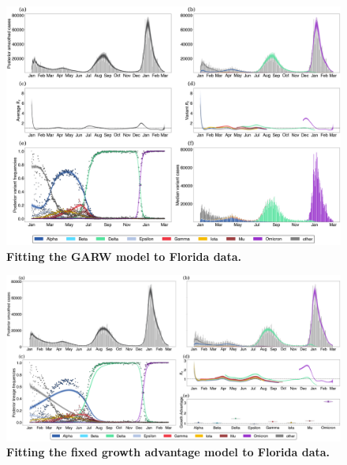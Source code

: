 \documentclass[11pt,oneside,letterpaper]{article}
\begin{document}
\begin{figure}
  \centering
  \includegraphics[width=\linewidth]{figs/GARW_rt_Florida.png}
  \caption{\textbf{Fitting the GARW model to Florida data.}}%
  \label{fig:GARW_rt_Florida}
\end{figure}

\begin{figure}
  \centering
  \includegraphics[width=\linewidth]{figs/fixed_growth_Florida.png}
  \caption{\textbf{Fitting the fixed growth advantage model to Florida data.}}%
  \label{fig:fixed_growth_Florida}
\end{figure}
\end{document}
